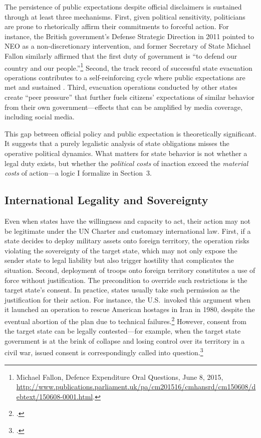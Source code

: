 \documentclass[12pt]{article}
\begin{document}
The persistence of public expectations despite official disclaimers is sustained through at least three mechanisms. First, given political sensitivity, politicians are prone to rhetorically affirm their commitments to forceful action. For instance, the British government's Defense Strategic Direction in 2011 pointed to NEO as a non-discretionary intervention, and former Secretary of State Michael Fallon similarly affirmed that the first duty of government is ``to defend our country and our people.''\footnote{Michael Fallon, Defence Expenditure Oral Questions, June 8, 2015, \url{http://www.publications.parliament.uk/pa/cm201516/cmhansrd/cm150608/debtext/150608-0001.html}.} Second, the track record of successful state evacuation operations contributes to a self-reinforcing cycle where public expectations are met and sustained \citep{Bond2016}. Third, evacuation operations conducted by other states create ``peer pressure'' that further fuels citizens' expectations of similar behavior from their own government---effects that can be amplified by media coverage, including social media.

This gap between official policy and public expectation is theoretically significant. It suggests that a purely legalistic analysis of state obligations misses the operative political dynamics. What matters for state behavior is not whether a legal duty exists, but whether the \emph{political costs} of inaction exceed the \emph{material costs} of action---a logic I formalize in Section~3.

\subsection{International Legality and Sovereignty}

Even when states have the willingness and capacity to act, their action may not be legitimate under the UN Charter and customary international law. First, if a state decides to deploy military assets onto foreign territory, the operation risks violating the sovereignty of the target state, which may not only expose the sender state to legal liability but also trigger hostility that complicates the situation. Second, deployment of troops onto foreign territory constitutes a use of force without justification. The precondition to override such restrictions is the target state's consent. In practice, states usually take such permission as the justification for their action. For instance, the U.S.\ invoked this argument when it launched an operation to rescue American hostages in Iran in 1980, despite the eventual abortion of the plan due to technical failures.\footnote{\citet{Alcala2024}.} However, consent from the target state can be legally contested---for example, when the target state government is at the brink of collapse and losing control over its territory in a civil war, issued consent is correspondingly called into question.\footnote{\citet{Alcala2024}.}
\end{document}
